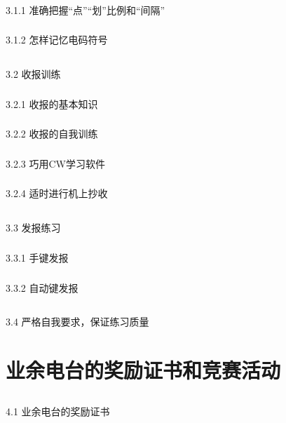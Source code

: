 \documentclass[12pt,UTF8]{ctexbook}
\begin{document}
\subsection{}3.1.1 准确把握“点”“划”比例和“间隔”
\subsection{}3.1.2 怎样记忆电码符号
\section{}3.2 收报训练
\subsection{}3.2.1 收报的基本知识
\subsection{}3.2.2 收报的自我训练
\subsection{}3.2.3 巧用CW学习软件
\subsection{}3.2.4 适时进行机上抄收
\section{}3.3 发报练习
\subsection{}3.3.1 手键发报
\subsection{}3.3.2 自动键发报
\section{}3.4 严格自我要求，保证练习质量

\chapter{业余电台的奖励证书和竞赛活动}

\section{}4.1 业余电台的奖励证书
\end{document}
